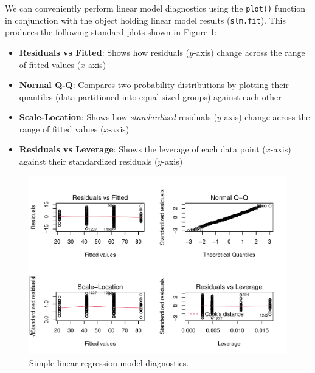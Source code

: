 \documentclass[
]{book}
\providecommand{\tightlist}{%
  \setlength{\itemsep}{0pt}\setlength{\parskip}{0pt}}
\begin{document}
We can conveniently perform linear model diagnostics using the \texttt{plot()} function in conjunction with the object holding linear model results (\texttt{slm.fit}). This produces the following standard plots shown in Figure \ref{fig:slm-diagnostics}:

\begin{itemize}
\tightlist
\item
  \textbf{Residuals vs Fitted}: Shows how residuals (\(y\)-axis) change across the range of fitted values (\(x\)-axis)
\item
  \textbf{Normal Q-Q}: Compares two probability distributions by plotting their quantiles (data partitioned into equal-sized groups) against each other
\item
  \textbf{Scale-Location}: Shows how \emph{standardized} residuals (\(y\)-axis) change across the range of fitted values (\(x\)-axis)
\item
  \textbf{Residuals vs Leverage}: Shows the leverage of each data point (\(x\)-axis) against their standardized residuals (\(y\)-axis)
\end{itemize}

\begin{figure}

{\centering \includegraphics[width=1\linewidth]{The_Fundamentals_of_People_Analytics_files/figure-latex/slm-diagnostics-1} 

}

\caption{Simple linear regression model diagnostics.}\label{fig:slm-diagnostics}
\end{figure}
\end{document}
